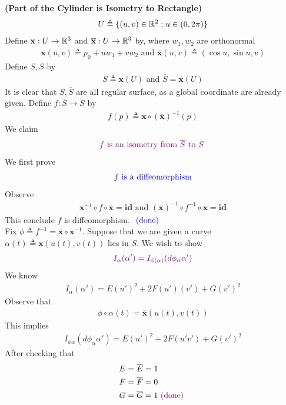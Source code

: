 \documentclass{report}
\begin{document}
\begin{Example}{\textbf{(Part of the Cylinder is Isometry to Rectangle)}}{}
\begin{align*}
U\triangleq \{ (u,v)\in\mathbb{R}^2: u \in (0,2\pi) \}
\end{align*}
Define $\textbf{x}:U\rightarrow \mathbb{R}^3$ and $\overline{\textbf{x}}:U\rightarrow \mathbb{R}^3$ by, where $w_1,w_2$ are orthonormal
\begin{align*}
\textbf{x}(u,v)\triangleq p_0+ uw_1+vw_2 \text{ and } \overline{\textbf{x}}(u,v)\triangleq (\cos u , \sin u , v)
\end{align*}
Define $S,\overline{S}$ by 
\begin{align*}
S\triangleq \textbf{x}(U)\text{ and } \overline{S}=\overline{\textbf{x}}(U)
\end{align*}
It is clear that $S,\overline{S}$ are all regular surface, as a global coordinate are already given. Define $f:\overline{S}\rightarrow S$ by 
\begin{align*}
f(p)\triangleq \textbf{x}\circ (\overline{\textbf{x}})^{-1}(p)
\end{align*}
We claim 
\begin{align*}
  \textcolor{violet}{f\text{ is an isometry from $\overline{S}$ to $S$ }}
\end{align*}
We first prove 
\begin{align*}
\textcolor{blue}{f\text{ is a diffeomorphism}}
\end{align*}
Observe 
\begin{align*}
  \textbf{x}^{-1} \circ f\circ \overline{\textbf{x}}=\textbf{id}\text{ and }  (\overline{\textbf{x}})^{-1}\circ  f^{-1}\circ \textbf{x}= \textbf{id}
\end{align*}
This conclude $f$ is diffeomorphism. $\textcolor{blue}{\text{ (done) }}$ \\

Fix $\phi \triangleq  f^{-1}= \overline{\textbf{x}}\circ \textbf{x}^{-1}$. Suppose that we are given a curve $\alpha (t)\triangleq \textbf{x}(u(t),v(t))$ lies in $S$. We wish to show 
 \begin{align*}
 \textcolor{violet}{I_\alpha (\alpha ')=I_{\phi (\alpha )}(d\phi_\alpha  \alpha ')}
\end{align*}
We know 
\begin{align*}
I_{\alpha }(\alpha ')=E (u')^2 + 2F(u')(v')+ G(v')^2
\end{align*}
Observe that 
\begin{align*}
\phi \circ \alpha (t)=\overline{\textbf{x}}(u(t),v(t))
\end{align*}
This implies 
\begin{align*}
I_{\phi \alpha }(d\phi_{\alpha }\alpha ')=\overline{E}(u')^2 + 2F(u'v')+ G(v')^2
\end{align*}
After checking that 
\begin{align*}
E&=\overline{E}=1\\
F&=\overline{F}=0\\
G&=\overline{G}=1 \textcolor{violet}{\text{ (done) }}
\end{align*}
\end{Example}
\end{document}
